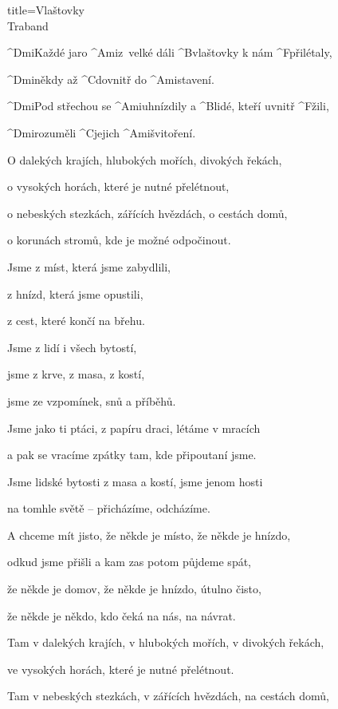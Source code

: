 \begin{song}{title=\predtitle\centering Vlaštovky \\\large Traband  \vspace*{-0.3cm}}  %
\begin{centerjustified}

\sloka 
	^{Dmi\z}Každé jaro ^{Ami\z}z~velké dáli ^{B\z }vlaštovky k nám ^{F\z }přilétaly,

	^{Dmi\z }někdy až ^{C\z }dovnitř do ^{\z Ami}stavení.

	^{Dmi}Pod střechou se ^{Ami\z }uhnízdily a ^{B\z }lidé, kteří uvnitř ^{F\z }žili,
	
	^{Dmi\z }rozuměli ^{C\z }jejich ^{\z Ami}švitoření.


\sloka 
	O dalekých krajích, hlubokých mořích, divokých řekách,

	o vysokých horách, které je nutné přelétnout,

	o nebeských stezkách, zářících hvězdách, o cestách domů,

	o korunách stromů, kde je možné odpočinout.


\sloka 
	Jsme z míst, která jsme zabydlili,

	z hnízd, která jsme opustili,

	z cest, které končí na břehu.

	Jsme z lidí i všech bytostí,

	jsme z krve, z masa, z kostí,

	jsme ze vzpomínek, snů a příběhů.


\sloka 
	Jsme jako ti ptáci, z papíru draci, létáme v mracích

	a pak se vracíme zpátky tam, kde připoutaní jsme.

	Jsme lidské bytosti z masa a kostí, jsme jenom hosti

	na tomhle světě -- přicházíme, odcházíme.


\sloka 
	A chceme mít jisto, že někde je místo, že někde je hnízdo,

	odkud jsme přišli a kam zas potom půjdeme spát,

	že někde je domov, že někde je hnízdo, útulno čisto,

	že někde je někdo, kdo čeká na nás, na návrat.


\sloka 
	Tam v dalekých krajích, v hlubokých mořích, v divokých řekách,

	ve vysokých horách, které je nutné přelétnout.

	Tam v nebeských stezkách, v zářících hvězdách, na cestách domů,


\end{centerjustified}
\end{song}
